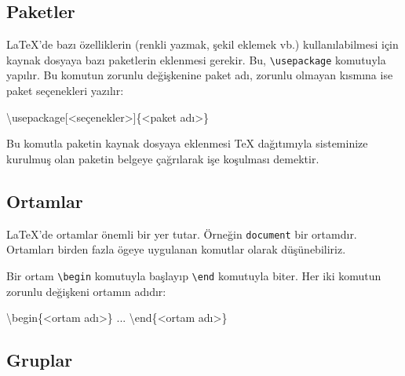 \documentclass[
  10pt,
]{scrbook}
\newenvironment{Shaded}{\begin{snugshade}}{\end{snugshade}}
\newcommand{\NormalTok}[1]{#1}
\newcommand{\SpecialCharTok}[1]{\textcolor[rgb]{0.00,0.00,0.00}{#1}}
\begin{document}
\hypertarget{paketler}{%
\subsection{Paketler}\label{paketler}}

LaTeX'de bazı özelliklerin (renkli yazmak, şekil eklemek vb.)
kullanılabilmesi için kaynak dosyaya bazı paketlerin eklenmesi gerekir.
Bu, \texttt{\textbackslash{}usepackage} komutuyla yapılır. Bu komutun zorunlu değişkenine
paket adı, zorunlu olmayan kısmına ise paket seçenekleri yazılır:

\begin{Shaded}
\begin{Highlighting}[]
\NormalTok{\textbackslash{}usepackage[}\SpecialCharTok{\textless{}}\NormalTok{seçenekler}\SpecialCharTok{\textgreater{}}\NormalTok{]\{}\SpecialCharTok{\textless{}}\NormalTok{paket adı}\SpecialCharTok{\textgreater{}}\NormalTok{\}}
\end{Highlighting}
\end{Shaded}

Bu komutla paketin kaynak dosyaya eklenmesi TeX dağıtımıyla sisteminize
kurulmuş olan paketin belgeye çağrılarak işe koşulması demektir.

\hypertarget{ortamlar}{%
\subsection{Ortamlar}\label{ortamlar}}

LaTeX'de ortamlar önemli bir yer tutar. Örneğin \texttt{document} bir ortamdır.
Ortamları birden fazla ögeye uygulanan komutlar olarak düşünebiliriz.

Bir ortam \texttt{\textbackslash{}begin} komutuyla başlayıp \texttt{\textbackslash{}end} komutuyla biter. Her iki
komutun zorunlu değişkeni ortamın adıdır:

\begin{Shaded}
\begin{Highlighting}[]
\NormalTok{\textbackslash{}begin\{}\SpecialCharTok{\textless{}}\NormalTok{ortam adı}\SpecialCharTok{\textgreater{}}\NormalTok{\}}
\NormalTok{ ...}
\NormalTok{\textbackslash{}end\{}\SpecialCharTok{\textless{}}\NormalTok{ortam adı}\SpecialCharTok{\textgreater{}}\NormalTok{\}}
\end{Highlighting}
\end{Shaded}

\hypertarget{gruplar}{%
\subsection{Gruplar}\label{gruplar}}
\end{document}
